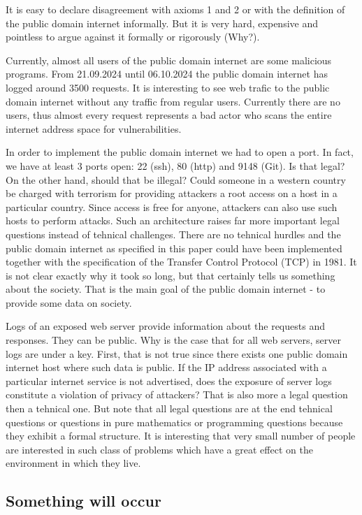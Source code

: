\documentclass{article}
\begin{document}
It is easy to declare disagreement with axioms 1 and 2 or with the definition of the
public domain internet informally. But it is very hard, expensive and pointless
to argue against it formally or rigorously (Why?).

Currently, almost all users of the public domain internet are some malicious programs.
From 21.09.2024 until 06.10.2024 the public domain internet has logged around
3500 requests. It is interesting to see web trafic to the public domain internet
without any traffic from regular users. Currently there are no users, thus almost
every request represents a bad actor who scans the entire internet address space
for vulnerabilities. 

In order to implement the public domain internet we had to open a port. In fact, we 
have at least 3 ports open: 22 (ssh), 80 (http) and 9148 (Git). Is that legal? On 
the other hand, should that be illegal? Could someone in a western country be 
charged with terrorism for providing attackers a root access on a host in a particular
country. Since access is free for anyone, attackers can also use such hosts to
perform attacks. Such an architecture raises far more important legal questions instead
of tehnical challenges. There are no tehnical hurdles and the public domain internet
as specified in this paper could have been implemented together with the specification
of the Transfer Control Protocol (TCP) in 1981. It is not clear exactly why it took so
long, but that certainly tells us something about the society. That is the main goal of
the public domain internet - to provide some data on society. 

Logs of an exposed web server provide information about the requests and responses. 
They can be public. Why is the case that for all web servers, server logs are under
a key. First, that is not true since there exists one public domain internet
host where such data is public. If the IP address associated with a particular
internet service is not advertised, does the exposure of server logs constitute
a violation of privacy of attackers? That is also more a legal question then a
tehnical one. But note that all legal questions are at the end tehnical questions
or questions in pure mathematics or programming questions because they exhibit a
formal structure. It is interesting that very small number of people are interested
in such class of problems which have a great effect on the environment in which
they live.

\subsection{Something will occur}
\end{document}
